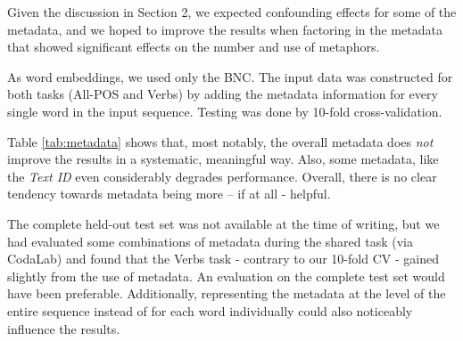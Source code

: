 \documentclass[11pt,a4paper]{article}
\begin{document}
Given the discussion in Section 2, we expected confounding effects for some of the metadata, and we hoped to improve the results when factoring in the metadata that showed significant effects on the number and use of metaphors.

As word embeddings, we used only the BNC.
The input data was constructed for both tasks (All-POS and Verbs) by adding the metadata information for every single word in the input sequence. 
Testing was done by 10-fold cross-validation.

Table \ref{tab:metadata} shows that, most notably, the overall metadata does \emph{not} improve the results in a systematic, meaningful way.
Also, some metadata, like the \emph{Text ID} even considerably degrades performance. Overall, there is no clear tendency towards metadata being more -- if at all - helpful.  

The complete held-out test set was not available at the time of writing, but we had evaluated some combinations of metadata during the shared task (via CodaLab) and found that the Verbs task - contrary to our 10-fold CV - gained slightly from the use of metadata. An evaluation on the complete test set would have been preferable. Additionally, representing the metadata at the level of the entire sequence instead of for each word individually could also noticeably influence the results.
\end{document}

